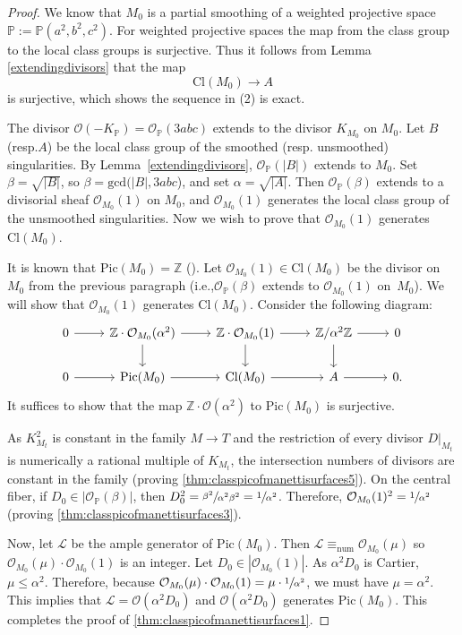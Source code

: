 \documentclass[11pt]{article}
\newcommand{\ie}{i.e.,\xspace}
\newcommand{\resp}{resp.\xspace}
\theoremstyle{plain}
\theoremstyle{definition}
\newcommand\PP{{\mathbb{P}}}
\newcommand\ZZ{{\mathbb Z}}
\newcommand\Lc{{\mathcal L}}
\newcommand\Oc{{\mathcal O}}
\newcommand\Cl{{\mathrm{Cl}}}
\newcommand\Pic{{\mathrm{Pic}}}
\newcommand\Pabc{{\PP(a^2,b^2,c^2)}}
\begin{document}
\begin{proof}
We know that $M_0$ is a partial smoothing of a weighted projective space $\PP:=\Pabc$. For weighted projective spaces the map from the class group to the local class groups is surjective. Thus it follows from Lemma \ref{extendingdivisors} that the map
\[
\Cl(M_0)\to A
\]
is surjective, which shows the sequence in (2) is exact.

The divisor $\Oc(-K_{\PP})=\Oc_{\PP}(3abc)$ extends to the divisor $K_{M_0}$ on $M_0$. Let $B$ (\resp $A$) be the local class group of the smoothed (\resp unsmoothed) singularities. By Lemma~\ref{extendingdivisors}, $\Oc_\PP(|B|)$ extends to $M_0$. Set $\beta = \sqrt{|B|}$, so $\beta=\mathrm{gcd}(|B|, 3abc$), and set $\alpha=\sqrt{|A|}$. Then $\Oc_\PP(\beta)$ extends to a divisorial sheaf $\Oc_{M_0}(1)$ on $M_0$, and $\Oc_{M_0}(1)$ generates the local class group of the unsmoothed singularities. Now we wish to prove that $\Oc_{M_0}(1)$ generates $\Cl(M_0)$.

It is known that $\Pic(M_0)=\ZZ$ (\cite[Lem.\,2.1, Prop.\,6.3]{Hacking}). Let $\Oc_{M_0}(1)\in \Cl(M_0)$ be the divisor on $M_0$ from the previous paragraph (\ie $\Oc_\PP(\beta)$ extends to $\Oc_{M_0}(1)$ on~$M_0$). We will show that $\Oc_{M_0}(1)$ generates $\Cl(M_0)$. Consider the following diagram:\vspace*{-3pt}
\[
\begin{tikzcd}
0\arrow[r] & \ZZ\cdot \Oc_{M_0}(\alpha^2)\arrow[r] \arrow[d]& \ZZ\cdot \Oc_{M_0}(1)\arrow[r]\arrow[d] & \ZZ/\alpha^2\ZZ\arrow[r]\arrow[d] &0\\
0 \arrow[r] &\Pic(M_0)\arrow[r] & \Cl(M_0)\arrow[r] & A\arrow[r] &0.
\end{tikzcd}
\]
It suffices to show that the map $\ZZ\cdot \Oc(\alpha^2)$ to $\Pic(M_0)$ is surjective.

As $K_{M_t}^2$ is constant in the family $M \to T$ and the restriction of every divisor $D|_{M_t}$ is numerically a rational multiple of $K_{M_t}$, the intersection numbers of divisors are constant in the family (proving \eqref{thm:classpicofmanettisurfaces5}). On the central fiber, if $D_0 \in |\Oc_\PP(\beta)|$, then $D_0^2 = \sfrac{\beta^2}{\alpha^2\beta^2} = \sfrac{1}{\alpha^2}$. Therefore, $\Oc_{M_0}(1)^2 = \sfrac{1}{\alpha^2}$ (proving \eqref{thm:classpicofmanettisurfaces3}).

Now, let $\Lc$ be the ample generator of $\Pic(M_0)$. Then $\Lc \equiv_{\mathrm{num}} \Oc_{M_0}(\mu)$ so $\Oc_{M_0}(\mu)\cdot \Oc_{M_0}(1)$ is an integer. Let $D_0 \in |\Oc_{M_0}(1)|$. As $\alpha^2D_0$ is Cartier, $\mu \le \alpha^2$. Therefore, because $\Oc_{M_0}(\mu)\cdot \Oc_{M_0}(1) = \mu \cdot\sfrac{1}{\alpha^2}$, we must have $\mu = \alpha^2$. This implies that $\Lc = \Oc(\alpha^2 D_0) $ and $\Oc(\alpha^2 D_0)$ generates $\Pic(M_0)$. This completes the proof of \eqref{thm:classpicofmanettisurfaces1}.


\end{proof}
\end{document}
